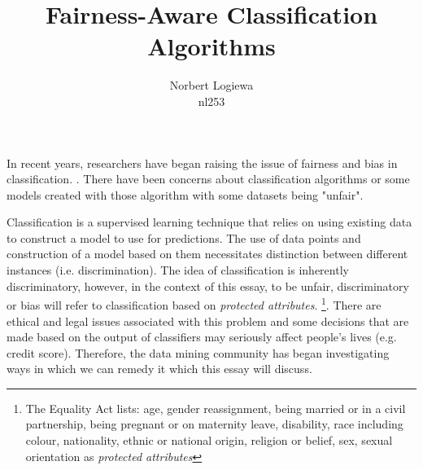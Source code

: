 \documentclass[a4paper, 12pt, titlepage]{article}
\date{} %
\author{Norbert Logiewa\\nl253}
\title{Fairness-Aware Classification Algorithms}
\begin{document}
\maketitle



In recent years, researchers have began raising the issue of fairness and bias in classification. \cite{pedreshi2008}. There have been concerns about classification algorithms or some models created with those algorithm with some datasets being "unfair".

Classification is a supervised learning technique that relies on using existing data to construct a model to use for predictions. The use of data points and construction of a model based on them necessitates distinction between different instances (i.e. discrimination). The idea of classification is inherently discriminatory, however, in the context of this essay, to be unfair, discriminatory or bias will refer to classification based on \emph{protected attributes}. \footnote{The Equality Act lists: age, gender reassignment, being married or in a civil partnership, being pregnant or on maternity leave, disability, race including colour, nationality, ethnic or national origin, religion or belief, sex, sexual orientation as \emph{protected attributes}}. There are ethical and legal issues associated with this problem and some decisions that are made based on the output of classifiers may seriously affect people's lives (e.g. credit score). Therefore, the data mining community has began investigating ways in which we can remedy it which this essay will discuss.

\end{document}
